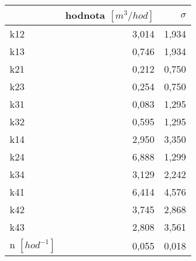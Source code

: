 \begin{tabular}{lrr}
\toprule
{} &  hodnota $\left[\si{m^3/hod}\right]$ &  $\sigma$ \\
\midrule
k12                 &                                3,014 &     1,934 \\
k13                 &                                0,746 &     1,934 \\
k21                 &                                0,212 &     0,750 \\
k23                 &                                0,254 &     0,750 \\
k31                 &                                0,083 &     1,295 \\
k32                 &                                0,595 &     1,295 \\
k14                 &                                2,950 &     3,350 \\
k24                 &                                6,888 &     1,299 \\
k34                 &                                3,129 &     2,242 \\
k41                 &                                6,414 &     4,576 \\
k42                 &                                3,745 &     2,868 \\
k43                 &                                2,808 &     3,561 \\
n $[\si{hod^{-1}}]$ &                                0,055 &     0,018 \\
\bottomrule
\end{tabular}
